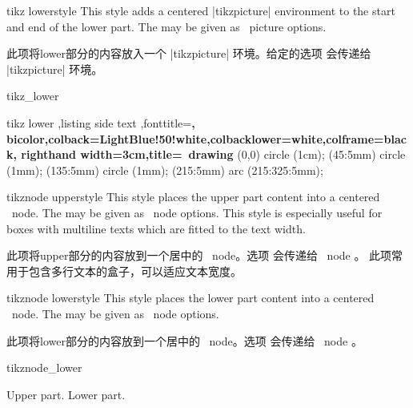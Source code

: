 \begin{docTcbKey}{tikz lower}{}{style}
This style adds a centered |tikzpicture| environment to the start and end
of the lower part. The  may be given as \tikzname\  picture options.

此项将lower部分的内容放入一个 |tikzpicture| 环境。给定的选项  会传递给 |tikzpicture| 环境。%
\begin{exdispExample}{tikz_lower}

\begin{tcblisting}{tikz lower%
,listing side text%
,fonttitle=\bfseries,
bicolor,colback=LightBlue!50!white,colbacklower=white,colframe=black,
righthand width=3cm,title=\tikzname\ drawing}
\path[fill=yellow,draw=yellow!75!red]
(0,0) circle (1cm);
\fill[red] (45:5mm) circle (1mm);
\fill[red] (135:5mm) circle (1mm);
\draw[line width=1mm,red]
(215:5mm) arc (215:325:5mm);
\end{tcblisting}
\end{exdispExample}
\end{docTcbKey}




\begin{docTcbKey}{tikznode upper}{}{style}
This style places the upper part content into a centered
\tikzname\  node. The  may be given as \tikzname\  node options.
This style is especially useful for boxes with multiline texts which are
fitted to the text width.

此项将upper部分的内容放到一个居中的 \tikzname\  node。选项  会传递给 \tikzname\  node 。
此项常用于包含多行文本的盒子，可以适应文本宽度。
\end{docTcbKey}

\begin{docTcbKey}{tikznode lower}{}{style}
This style places the lower part content into a centered
\tikzname\ node. The  may be given as \tikzname\  node options.

此项将lower部分的内容放到一个居中的 \tikzname\  node。选项  会传递给 \tikzname\  node 。
\begin{exdispExample}{tikznode_lower}
\begin{tcolorbox}[bicolor,colback=LightBlue!50!white,colbacklower=white,
colframe=black,tikznode lower={inner sep=2pt,draw=red,fill=yellow}]
Upper part.
\tcblower
Lower part.
\end{tcolorbox}
\end{exdispExample}
\end{docTcbKey}



